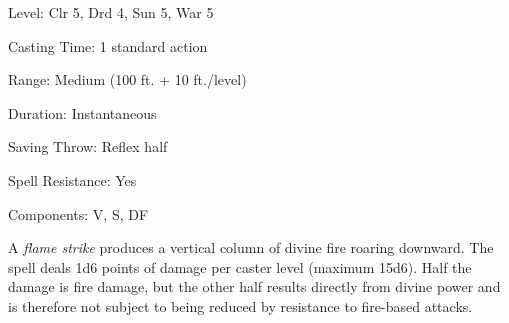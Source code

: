 
\begin{description*}
\item[Level:] Clr 5, Drd 4, Sun 5, War 5
\item[Casting Time:] 1 standard action
\item[Range:] Medium (100 ft. + 10 ft./level)
\item[Duration:] Instantaneous
\item[Saving Throw:] Reflex half
\item[Spell Resistance:] Yes
\item[Components:] V, S, DF
\end{description*}

A \textit{flame strike} produces a vertical column of divine fire roaring downward.
The spell deals 1d6 points of damage per caster level (maximum 15d6). Half the
damage is fire damage, but the other half results directly from divine power and
is therefore not subject to being reduced by resistance to fire-based attacks.